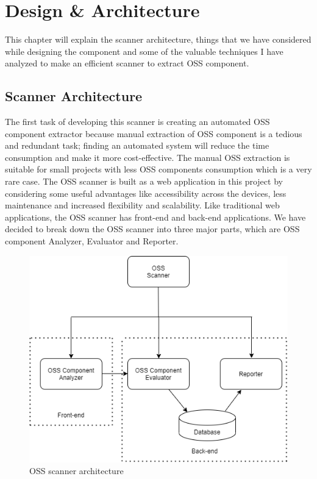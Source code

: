 %
\section{Design \& Architecture}\label{sec:design_architecture}
%
This chapter will explain the scanner architecture, things that we have considered while designing the component and some of the valuable techniques I have analyzed to make an efficient scanner to extract \acs{OSS} component.

\subsection{Scanner Architecture}
 The first task of developing this scanner is creating an automated \acs{OSS} component extractor because manual extraction of \acs{OSS} component is a tedious and redundant task; finding an automated system will reduce the time consumption and make it more cost-effective. The manual \acs{OSS} extraction is suitable for small projects with less \acs{OSS} components consumption which is a very rare case. The \acs{OSS} scanner is built as a web application in this project by considering some useful advantages like accessibility across the devices, less maintenance and increased flexibility and scalability. Like traditional web applications, the \acs{OSS} scanner has front-end and back-end applications. We have decided to break down the \acs{OSS} scanner into three major parts, which are \acs{OSS} component Analyzer, Evaluator and Reporter. 
 \begin{figure}[h!]
 	\includegraphics[width=15cm]{includes/architetcure.png}
 	\centering
 	\caption{\acs{OSS} scanner architecture}
 	\label{fig:architecture}
 \end{figure}
